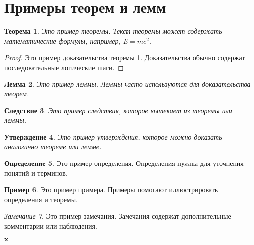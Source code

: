 \documentclass{article}
\newtheorem{theorem}{Теорема}[section]
\newtheorem{lemma}[theorem]{Лемма}
\newtheorem{corollary}[theorem]{Следствие}
\newtheorem{proposition}[theorem]{Утверждение}
\theoremstyle{definition}
\newtheorem{definition}[theorem]{Определение}
\newtheorem{example}[theorem]{Пример}
\theoremstyle{remark}
\newtheorem{remark}[theorem]{Замечание}
\begin{document}
	\tableofcontents
	
	\section{Примеры теорем и лемм}
	
	\begin{theorem}
		\label{theorem:example}
		Это пример теоремы. Текст теоремы может содержать математические формулы, например, \( E = mc^2 \).
	\end{theorem}
	
	\begin{proof}
		Это пример доказательства теоремы \ref{theorem:example}. Доказательства обычно содержат последовательные логические шаги.
	\end{proof}
	
	\begin{lemma}
		Это пример леммы. Леммы часто используются для доказательства теорем.
	\end{lemma}
	
	\begin{corollary}
		Это пример следствия, которое вытекает из теоремы или леммы.
	\end{corollary}
	
	\begin{proposition}
		Это пример утверждения, которое можно доказать аналогично теореме или лемме.
	\end{proposition}
	
	\begin{definition}
		Это пример определения. Определения нужны для уточнения понятий и терминов.
	\end{definition}
	
	\begin{example}
		Это пример примера. Примеры помогают иллюстрировать определения и теоремы.
	\end{example}
	
	\begin{remark}
		Это пример замечания. Замечания содержат дополнительные комментарии или наблюдения.
	\end{remark}
	
	$\mathbf{x}$
	
\end{document}
